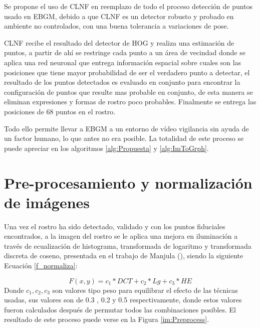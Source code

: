 Se propone el uso de \acf{CLNF} en reemplazo de todo el proceso detección de puntos usado en \ac{EBGM}, debido a que \ac{CLNF} es un detector robusto y probado en ambiente no controlados, con una buena tolerancia a variaciones de pose.

\ac{CLNF} recibe el resultado del detector de \ac{HOG} y realiza una estimación de puntos, a partir de ahí se restringe cada punto a un área de vecindad donde se aplica una red neuronal que entrega información espacial sobre cuales son las posiciones que tiene mayor probabilidad de ser el verdadero punto a detectar, el resultado de los puntos detectados es evaluado en conjunto para encontrar la configuración de puntos que resulte mas probable en conjunto, de esta manera se eliminan expresiones y formas de rostro poco probables. Finalmente se entrega las posiciones de 68 puntos en el rostro.


Todo ello permite llevar a \ac{EBGM} a un entorno de vídeo vigilancia sin ayuda de un factor humano, lo que antes no era posible. La totalidad de este proceso se puede apreciar en los algoritmos \ref{alg:Propuesta} y \ref{alg:ImToGrph}.

\section{Pre-procesamiento y normalización de imágenes}\label{scc:PropIluminacion}

Una vez el rostro ha sido detectado, validado y con los puntos fiduciales encontrados, a la imagen del rostro se le aplica una mejora en iluminación a través de ecualización de histograma, transformada de logaritmo y transformada discreta de coseno, presentada en el trabajo de Manjula (\cite{manjulaimage}), siendo la siguiente Ecuación \ref{f_normaliza}:


\begin{equation}
	F(x,y) = c_{1}*DCT + c_{2}*Lg + c_{3}*HE
    \label{f_normaliza}
\end{equation}
Donde $c_{1}, c_{2}, c_{3}$ son valores tipo peso para equilibrar el efecto de las técnicas usadas, sus valores son de 0.3 , 0.2 y 0.5 respectivamente, donde estos valores fueron calculados después de permutar todos las combinaciones posibles. El resultado de este proceso puede verse en la Figura \ref{im:Preprocess}.

